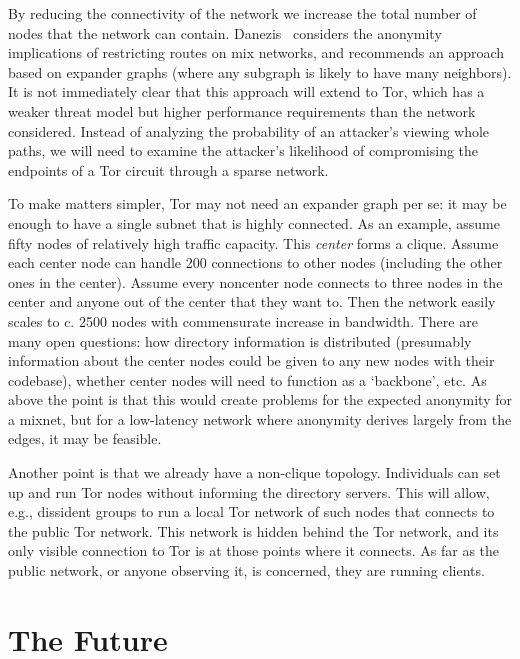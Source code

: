 \documentclass{llncs}
\begin{document}
By reducing the connectivity of the network we increase the total number of
nodes that the network can contain. Danezis~\cite{danezis-pets03} considers
the anonymity implications of restricting routes on mix networks, and
recommends an approach based on expander graphs (where any subgraph is likely
to have many neighbors).  It is not immediately clear that this approach will
extend to Tor, which has a weaker threat model but higher performance
requirements than the network considered.  Instead of analyzing the
probability of an attacker's viewing whole paths, we will need to examine the
attacker's likelihood of compromising the endpoints of a Tor circuit through
a sparse network.


To make matters simpler, Tor may not need an expander graph per se: it
may be enough to have a single subnet that is highly connected.  As an
example, assume fifty nodes of relatively high traffic capacity.  This
\emph{center} forms a clique.  Assume each center node can
handle 200 connections to other nodes (including the other ones in the
center). Assume every noncenter node connects to three nodes in the
center and anyone out of the center that they want to.  Then the
network easily scales to c. 2500 nodes with commensurate increase in
bandwidth. There are many open questions: how directory information
is distributed (presumably information about the center nodes could
be given to any new nodes with their codebase), whether center nodes
will need to function as a `backbone', etc. As above the point is
that this would create problems for the expected anonymity for a mixnet,
but for a low-latency network where anonymity derives largely from
the edges, it may be feasible.

Another point is that we already have a non-clique topology.
Individuals can set up and run Tor nodes without informing the
directory servers. This will allow, e.g., dissident groups to run a
local Tor network of such nodes that connects to the public Tor
network. This network is hidden behind the Tor network, and its
only visible connection to Tor is at those points where it connects.
As far as the public network, or anyone observing it, is concerned,
they are running clients.

\section{The Future}
\label{sec:conclusion}
\end{document}
